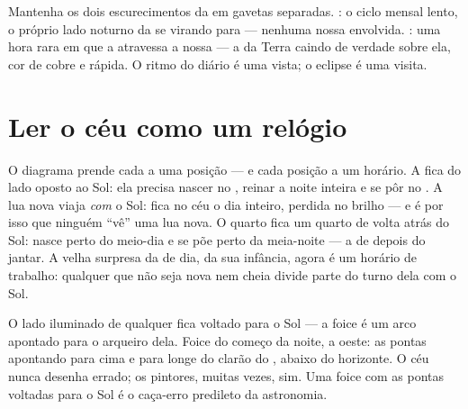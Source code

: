 \begin{example}\label{ex:g7:moon-phases:eclipsevs}
Mantenha os dois escurecimentos da  em gavetas separadas.
\emph{}: o ciclo mensal lento, o próprio lado noturno da  se
virando para  --- nenhuma  nossa envolvida. \emph{}: uma hora rara em que a  atravessa a nossa  ---
a  da Terra caindo de verdade sobre ela, cor de cobre e rápida.
O ritmo do diário é uma vista; o eclipse é uma visita.
\end{example}

\section{Ler o céu como um relógio}

\begin{example}\label{ex:g7:moon-phases:hours}
O diagrama prende cada  a uma posição --- e cada posição a um
horário. A  fica do lado oposto ao Sol: ela precisa nascer
no , reinar a noite inteira e se pôr no . A
lua nova viaja \emph{com} o Sol: fica no céu o dia inteiro, perdida
no brilho --- e é por isso que ninguém ``vê'' uma lua nova. O quarto
 fica um quarto de volta atrás do Sol: nasce perto do
meio-dia e se põe perto da meia-noite --- a  de depois do jantar.
A velha surpresa da  de dia, da sua infância, agora é um horário
de trabalho: qualquer  que não seja nova nem cheia divide parte do
turno dela com o Sol.
\end{example}

\begin{example}\label{ex:g7:moon-phases:points}
O lado iluminado de qualquer  fica voltado para o Sol --- a foice
é um arco apontado para o arqueiro dela. Foice do começo da noite, a
oeste: as pontas apontando para cima e para longe do clarão do , abaixo do horizonte. O céu nunca desenha errado; os pintores,
muitas vezes, sim. Uma foice com as pontas voltadas para o Sol é o
caça-erro predileto da astronomia.
\end{example}

